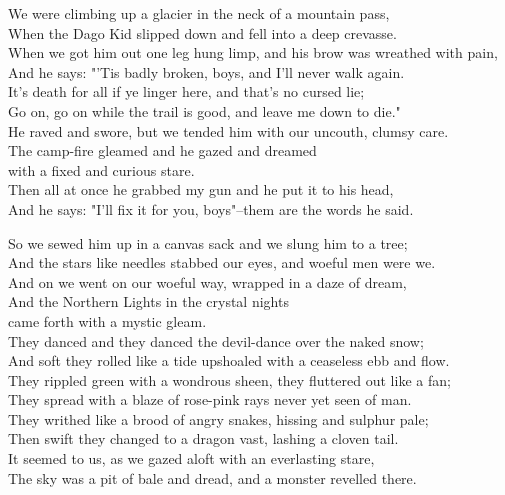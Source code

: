 \begin{poemblock}
We were climbing up a glacier in the neck of a mountain pass,\\
When the Dago Kid slipped down and fell into a deep crevasse.\\
When we got him out one leg hung limp, and his brow was wreathed with pain,\\
And he says:  "'Tis badly broken, boys, and I'll never walk again.\\
It's death for all if ye linger here, and that's no cursed lie;\\
Go on, go on while the trail is good, and leave me down to die."\\
He raved and swore, but we tended him with our uncouth, clumsy care.\\
The camp-fire gleamed and he gazed and dreamed\\
\idt with a fixed and curious stare.\\
Then all at once he grabbed my gun and he put it to his head,\\
And he says:  "I'll fix it for you, boys"--them are the words he said.

So we sewed him up in a canvas sack and we slung him to a tree;\\
And the stars like needles stabbed our eyes, and woeful men were we.\\
And on we went on our woeful way, wrapped in a daze of dream,\\
And the Northern Lights in the crystal nights\\
\idt came forth with a mystic gleam.\\
They danced and they danced the devil-dance over the naked snow;\\
And soft they rolled like a tide upshoaled with a ceaseless ebb and flow.\\
They rippled green with a wondrous sheen, they fluttered out like a fan;\\
They spread with a blaze of rose-pink rays never yet seen of man.\\
They writhed like a brood of angry snakes, hissing and sulphur pale;\\
Then swift they changed to a dragon vast, lashing a cloven tail.\\
It seemed to us, as we gazed aloft with an everlasting stare,\\
The sky was a pit of bale and dread, and a monster revelled there.


\end{poemblock}
